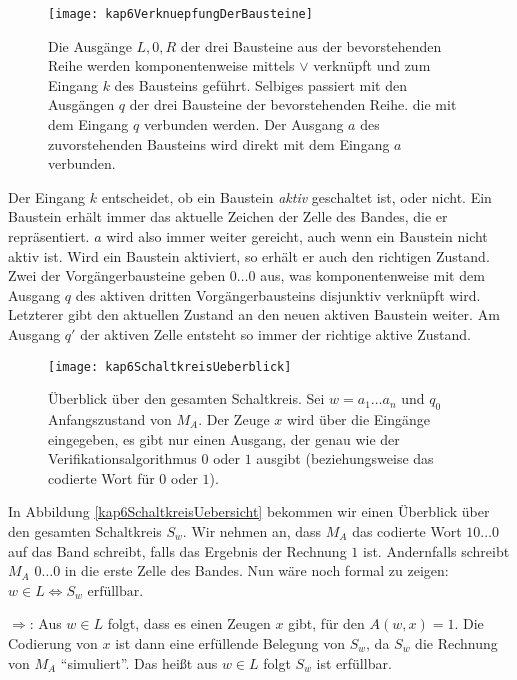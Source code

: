 \begin{Bew}
  \begin{figure}[htp]
    \centering
    \texttt{[image: kap6VerknuepfungDerBausteine]}
    \caption{Die Ausgänge $L, 0, R$ der drei Bausteine aus der bevorstehenden Reihe werden komponentenweise mittels $\vee$ verknüpft und zum Eingang $k$ des Bausteins geführt. Selbiges passiert mit den Ausgängen $q$ der drei Bausteine der bevorstehenden Reihe. die mit dem Eingang $q$ verbunden werden. Der Ausgang $a$ des zuvorstehenden Bausteins wird direkt mit dem Eingang $a$ verbunden.	}
    \label{kap6VerknuepfungDerBausteine}
  \end{figure}
  
  Der Eingang $k$ entscheidet, ob ein Baustein \textit{aktiv} geschaltet ist, oder nicht. Ein Baustein erhält immer das aktuelle Zeichen der Zelle des Bandes, die er repräsentiert. $a$ wird also immer weiter gereicht, auch wenn ein Baustein nicht aktiv ist. Wird ein Baustein aktiviert, so erhält er auch den richtigen Zustand. Zwei der Vorgängerbausteine geben $0 \ldots 0$ aus, was komponentenweise mit dem Ausgang $q$ des aktiven dritten Vorgängerbausteins disjunktiv verknüpft wird. Letzterer gibt den aktuellen Zustand an den neuen aktiven Baustein weiter. Am Ausgang $q'$ der aktiven Zelle entsteht so immer der richtige aktive Zustand.
  
  \begin{figure}[hbp]
    \centering
    \texttt{[image: kap6SchaltkreisUeberblick]}
    \caption{Überblick über den gesamten Schaltkreis. Sei $w= a_1 \ldots a_n$ und $q_0$ Anfangszustand von $M_A$. Der Zeuge $x$ wird über die Eingänge eingegeben, es gibt nur einen Ausgang, der genau wie der Verifikationsalgorithmus $0$ oder $1$ ausgibt (beziehungsweise das codierte Wort für $0$ oder $1$).}
    \label{kap6SchaltkreisUebersicht}
  \end{figure}
  
  In Abbildung \vref{kap6SchaltkreisUebersicht} bekommen wir einen Überblick über den gesamten Schaltkreis $S_w$. Wir nehmen an, dass $M_A$ das codierte Wort $10 \ldots 0$ auf das Band schreibt, falls das Ergebnis der Rechnung $1$ ist. Andernfalls schreibt $M_A$ $0 \ldots 0$ in die erste Zelle des Bandes. Nun wäre noch formal zu zeigen: $w \in L \Leftrightarrow S_w \text{ erfüllbar}$.
  
  \glq$\Rightarrow$\grq: Aus $w\in L$ folgt, dass es einen Zeugen $x$ gibt, für den $A(w,x)=1$. Die Codierung von $x$ ist dann eine erfüllende Belegung von $S_w$, da $S_w$ die Rechnung von $M_A$ "`simuliert"'. Das heißt aus $w \in L$ folgt $S_w$ ist erfüllbar.
  

\end{Bew}
